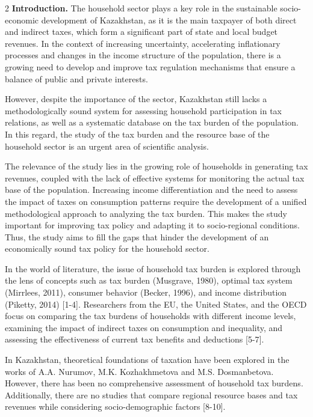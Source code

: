 \begin{multicols}{2}
{\bfseries Introduction.} The household sector plays a key role in the
sustainable socio-economic development of Kazakhstan, as it is the main
taxpayer of both direct and indirect taxes, which form a significant
part of state and local budget revenues. In the context of increasing
uncertainty, accelerating inflationary processes and changes in the
income structure of the population, there is a growing need to develop
and improve tax regulation mechanisms that ensure a balance of public
and private interests.

However, despite the importance of the sector, Kazakhstan still lacks a
methodologically sound system for assessing household participation in
tax relations, as well as a systematic database on the tax burden of the
population. In this regard, the study of the tax burden and the resource
base of the household sector is an urgent area of scientific analysis.

The relevance of the study lies in the growing role of households in
generating tax revenues, coupled with the lack of effective systems for
monitoring the actual tax base of the population. Increasing income
differentiation and the need to assess the impact of taxes on
consumption patterns require the development of a unified methodological
approach to analyzing the tax burden. This makes the study important for
improving tax policy and adapting it to socio-regional conditions. Thus,
the study aims to fill the gaps that hinder the development of an
economically sound tax policy for the household sector.

In the world of literature, the issue of household tax burden is
explored through the lens of concepts such as tax burden (Musgrave,
1980), optimal tax system (Mirrlees, 2011), consumer behavior (Becker,
1996), and income distribution (Piketty, 2014) {[}1-4{]}. Researchers
from the EU, the United States, and the OECD focus on comparing the tax
burdens of households with different income levels, examining the impact
of indirect taxes on consumption and inequality, and assessing the
effectiveness of current tax benefits and deductions {[}5-7{]}.

In Kazakhstan, theoretical foundations of taxation have been explored in
the works of A.A. Nurumov, M.K. Kozhakhmetova and M.S. Dosmanbetova.
However, there has been no comprehensive assessment of household tax
burdens. Additionally, there are no studies that compare regional
resource bases and tax revenues while considering socio-demographic
factors {[}8-10{]}.


\end{multicols}
